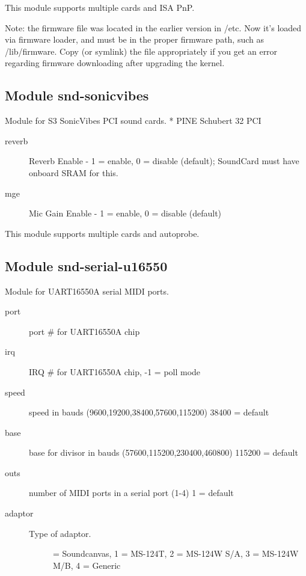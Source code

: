 \documentclass[a4paper,8pt,english]{sphinxmanual}
\begin{document}
This module supports multiple cards and ISA PnP.

Note: the firmware file  was located in the earlier
version in /etc.  Now it's loaded via firmware loader, and
must be in the proper firmware path, such as /lib/firmware.
Copy (or symlink) the file appropriately if you get an error
regarding firmware downloading after upgrading the kernel.


\subsection{Module snd-sonicvibes}
\label{sound/alsa-configuration:module-snd-sonicvibes}
Module for S3 SonicVibes PCI sound cards.
* PINE Schubert 32 PCI
\begin{description}
\item[{reverb}] \leavevmode
Reverb Enable - 1 = enable, 0 = disable (default);
SoundCard must have onboard SRAM for this.

\item[{mge}] \leavevmode
Mic Gain Enable - 1 = enable, 0 = disable (default)

\end{description}

This module supports multiple cards and autoprobe.


\subsection{Module snd-serial-u16550}
\label{sound/alsa-configuration:module-snd-serial-u16550}
Module for UART16550A serial MIDI ports.
\begin{description}
\item[{port}] \leavevmode
port \# for UART16550A chip

\item[{irq}] \leavevmode
IRQ \# for UART16550A chip, -1 = poll mode

\item[{speed}] \leavevmode
speed in bauds (9600,19200,38400,57600,115200)
38400 = default

\item[{base}] \leavevmode
base for divisor in bauds (57600,115200,230400,460800)
115200 = default

\item[{outs}] \leavevmode
number of MIDI ports in a serial port (1-4)
1 = default

\item[{adaptor}] \leavevmode\begin{description}
\item[{Type of adaptor.}]  = Soundcanvas, 1 = MS-124T, 2 = MS-124W S/A,
3 = MS-124W M/B, 4 = Generic

\end{description}

\end{description}
\end{document}
